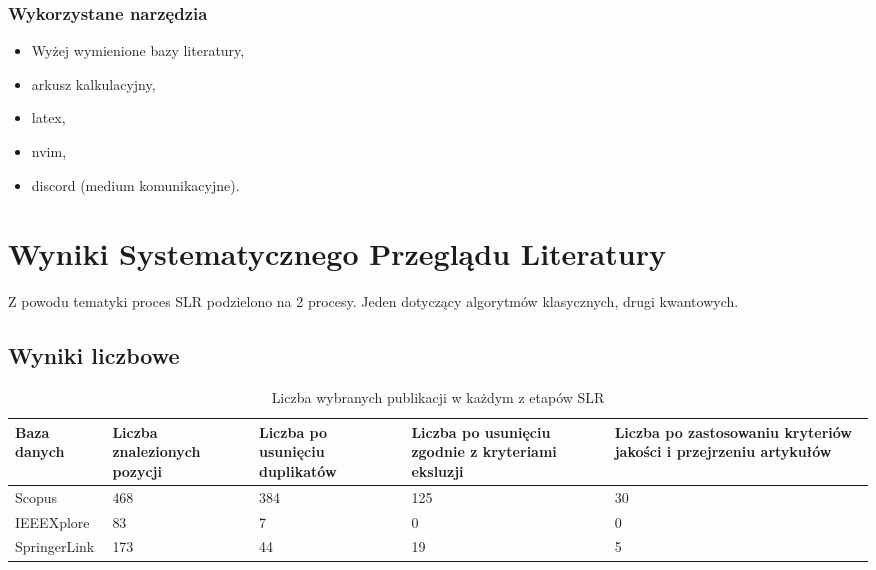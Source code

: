 \documentclass[polish,envcountsect,10pt]{article}
\begin{document}
\subsubsection{Wykorzystane narzędzia}

\begin{itemize}
	\item Wyżej wymienione bazy literatury,
	\item arkusz kalkulacyjny,
	\item latex,
	\item nvim,
	\item discord (medium komunikacyjne).
\end{itemize}

\section{Wyniki Systematycznego Przeglądu Literatury}

Z powodu tematyki proces SLR podzielono na 2 procesy. Jeden dotyczący algorytmów klasycznych, drugi kwantowych.

\subsection{Wyniki liczbowe}

\begin{table}[H]
	\caption{Liczba wybranych publikacji w każdym z etapów SLR}
	\centering
	\begin{tabular}{|p{2cm}|p{3cm}|p{3cm}|p{3cm}|p{3cm}|}
		\hline
		Baza danych  & Liczba znalezionych pozycji & Liczba po usunięciu duplikatów & Liczba po usunięciu zgodnie z kryteriami eksluzji & Liczba po zastosowaniu kryteriów jakości i przejrzeniu artykułów \\
		\hline
		Scopus       & 468                         & 384                            & 125                                               & 30                                                               \\
		\hline
		IEEEXplore   & 83                          & 7                              & 0                                                 & 0                                                                \\
		\hline
		SpringerLink & 173                         & 44                             & 19                                                & 5                                                                \\
		\hline
	\end{tabular}
\end{table}
\end{document}
